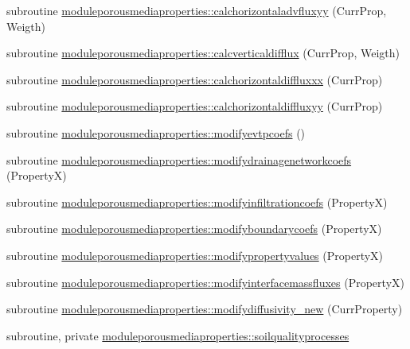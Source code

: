 \begin{DoxyCompactItemize}
\item 
subroutine \mbox{\hyperlink{namespacemoduleporousmediaproperties_a0a76735f032f1dc67ea140ec4b090be9}{moduleporousmediaproperties\+::calchorizontaladvfluxyy}} (Curr\+Prop, Weigth)
\item 
subroutine \mbox{\hyperlink{namespacemoduleporousmediaproperties_aaa3c9648a06189bd69f555e24fa2a81e}{moduleporousmediaproperties\+::calcverticaldifflux}} (Curr\+Prop, Weigth)
\item 
subroutine \mbox{\hyperlink{namespacemoduleporousmediaproperties_ac3477d319b62465ddf85f06d31d2310b}{moduleporousmediaproperties\+::calchorizontaldiffluxxx}} (Curr\+Prop)
\item 
subroutine \mbox{\hyperlink{namespacemoduleporousmediaproperties_a060f429ecbcbfc17419b00ac5e09e9de}{moduleporousmediaproperties\+::calchorizontaldiffluxyy}} (Curr\+Prop)
\item 
subroutine \mbox{\hyperlink{namespacemoduleporousmediaproperties_acb53435edd626676edd69fc709aa276c}{moduleporousmediaproperties\+::modifyevtpcoefs}} ()
\item 
subroutine \mbox{\hyperlink{namespacemoduleporousmediaproperties_ab821bd146f4dac552711604b920efa4a}{moduleporousmediaproperties\+::modifydrainagenetworkcoefs}} (PropertyX)
\item 
subroutine \mbox{\hyperlink{namespacemoduleporousmediaproperties_a5e436455f541e5914817fe2e3c9aa3f1}{moduleporousmediaproperties\+::modifyinfiltrationcoefs}} (PropertyX)
\item 
subroutine \mbox{\hyperlink{namespacemoduleporousmediaproperties_a4a088b65d745be5c1c555008b706cf6a}{moduleporousmediaproperties\+::modifyboundarycoefs}} (PropertyX)
\item 
subroutine \mbox{\hyperlink{namespacemoduleporousmediaproperties_a4a86b3e01bf62024194ec6a00d661a86}{moduleporousmediaproperties\+::modifypropertyvalues}} (PropertyX)
\item 
subroutine \mbox{\hyperlink{namespacemoduleporousmediaproperties_a4f53429b96a7e06258d5ab4a001405e9}{moduleporousmediaproperties\+::modifyinterfacemassfluxes}} (PropertyX)
\item 
subroutine \mbox{\hyperlink{namespacemoduleporousmediaproperties_aed31037cfdb4a26f847b51c25507a881}{moduleporousmediaproperties\+::modifydiffusivity\+\_\+new}} (Curr\+Property)
\item 
subroutine, private \mbox{\hyperlink{namespacemoduleporousmediaproperties_a2045bbe7b3450cd88b6aae4509fbe0c5}{moduleporousmediaproperties\+::soilqualityprocesses}}
\item 

\end{DoxyCompactItemize}
